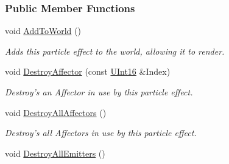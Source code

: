 \subsubsection*{Public Member Functions}
\begin{DoxyCompactItemize}
\item 
void \hyperlink{classMezzanine_1_1ParticleEffect_a404d1a6fa07ea2fc5937854ea05702f0}{AddToWorld} ()
\begin{DoxyCompactList}\small\item\em Adds this particle effect to the world, allowing it to render. \item\end{DoxyCompactList}\item 
void \hyperlink{classMezzanine_1_1ParticleEffect_a17d3cf19370d74b724fcbb737c8ff30e}{DestroyAffector} (const \hyperlink{namespaceMezzanine_a1b6c09063432c7ddd87011c88306c767}{UInt16} \&Index)
\begin{DoxyCompactList}\small\item\em Destroy's an Affector in use by this particle effect. \item\end{DoxyCompactList}\item 
\hypertarget{classMezzanine_1_1ParticleEffect_a11b8d00124844fc531ca4018b0b5d49f}{
void \hyperlink{classMezzanine_1_1ParticleEffect_a11b8d00124844fc531ca4018b0b5d49f}{DestroyAllAffectors} ()}
\label{classMezzanine_1_1ParticleEffect_a11b8d00124844fc531ca4018b0b5d49f}

\begin{DoxyCompactList}\small\item\em Destroy's all Affectors in use by this particle effect. \item\end{DoxyCompactList}\item 
\hypertarget{classMezzanine_1_1ParticleEffect_aa94e64c4b3355cd470c362ea24b907e7}{
void \hyperlink{classMezzanine_1_1ParticleEffect_aa94e64c4b3355cd470c362ea24b907e7}{DestroyAllEmitters} ()}
\label{classMezzanine_1_1ParticleEffect_aa94e64c4b3355cd470c362ea24b907e7}


\end{DoxyCompactItemize}
